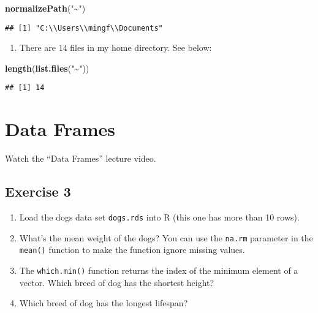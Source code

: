 \documentclass[
]{article}
\newenvironment{Shaded}{\begin{snugshade}}{\end{snugshade}}
\newcommand{\KeywordTok}[1]{\textcolor[rgb]{0.13,0.29,0.53}{\textbf{#1}}}
\newcommand{\NormalTok}[1]{#1}
\newcommand{\StringTok}[1]{\textcolor[rgb]{0.31,0.60,0.02}{#1}}
\providecommand{\tightlist}{%
  \setlength{\itemsep}{0pt}\setlength{\parskip}{0pt}}
\begin{document}
\begin{Shaded}
\begin{Highlighting}[]
\KeywordTok{normalizePath}\NormalTok{(}\StringTok{"\textasciitilde{}"}\NormalTok{)}
\end{Highlighting}
\end{Shaded}

\begin{verbatim}
## [1] "C:\\Users\\mingf\\Documents"
\end{verbatim}

\begin{enumerate}
\def\labelenumi{\arabic{enumi}.}
\setcounter{enumi}{2}
\tightlist
\item
  There are \(14\) files in my home directory. See below:
\end{enumerate}

\begin{Shaded}
\begin{Highlighting}[]
\KeywordTok{length}\NormalTok{(}\KeywordTok{list.files}\NormalTok{(}\StringTok{"\textasciitilde{}"}\NormalTok{))}
\end{Highlighting}
\end{Shaded}

\begin{verbatim}
## [1] 14
\end{verbatim}

\hypertarget{data-frames}{%
\section{Data Frames}\label{data-frames}}

Watch the ``Data Frames'' lecture video.

\hypertarget{exercise-3}{%
\subsection{Exercise 3}\label{exercise-3}}

\begin{enumerate}
\def\labelenumi{\arabic{enumi}.}
\tightlist
\item
  Load the dogs data set \texttt{dogs.rds} into R (this one has more
  than 10 rows).
\item
  What's the mean weight of the dogs? You can use the \texttt{na.rm}
  parameter in the \texttt{mean()} function to make the function ignore
  missing values.
\item
  The \texttt{which.min()} function returns the index of the minimum
  element of a vector. Which breed of dog has the shortest height?
\item
  Which breed of dog has the longest lifespan?
\end{enumerate}
\end{document}
